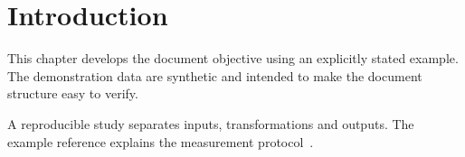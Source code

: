 \chapter{Introduction}


\label{sec:chapter1}
This chapter develops the document objective using an explicitly stated example. The demonstration data are synthetic and intended to make the document structure easy to verify.

A reproducible study separates inputs, transformations and outputs. The example reference explains the measurement protocol~\cite{example}.

